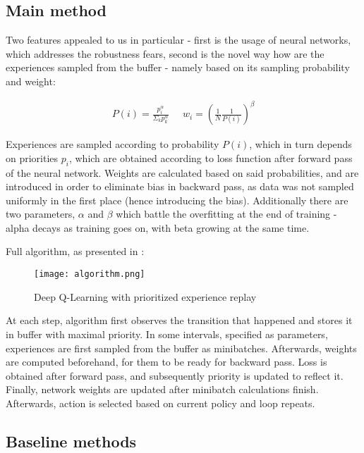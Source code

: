 \documentclass[a4paper,11pt]{article}
\theoremstyle{definition}
\begin{document}
\subsection{Main method}

Two features appealed to us in particular - first is the usage of neural networks, which addresses the robustness fears, second is the novel way how are the experiences sampled from the buffer - namely based on its sampling probability and weight:

\begin{align*}
    P(i) = \frac{p_i^{\alpha}}{\Sigma_k p_k^{\alpha}} \;\;\;\;\;
    w_i = (\frac{1}{N} \frac{1}{P(i)})^{\beta}
\end{align*}

Experiences are sampled according to probability $P(i)$, which in turn depends on priorities $p_i$, which are obtained according to loss function after forward pass of the neural network. Weights are calculated based on said probabilities, and are introduced in order to eliminate bias in backward pass, as data was not sampled uniformly in the first place (hence introducing the bias). Additionally there are two parameters, $\alpha$ and $\beta$ which battle the overfitting at the end of training - alpha decays as training goes on, with beta growing at the same time. 

Full algorithm, as presented in \cite{schaul_2016}:

\begin{figure}[h]
    \centering
    \texttt{[image: algorithm.png]}
    \caption{Deep Q-Learning with prioritized experience replay}
    \label{fig:my_label}
\end{figure}

At each step, algorithm first observes the transition that happened and stores it in buffer with maximal priority. In some intervals, specified as parameters, experiences are first sampled from the buffer as minibatches. Afterwards, weights are computed beforehand, for them to be ready for backward pass. Loss is obtained after forward pass, and subsequently priority is updated to reflect it. Finally, network weights are updated after minibatch calculations finish. Afterwards, action is selected based on current policy and loop repeats. 

\subsection{Baseline methods}
\end{document}
